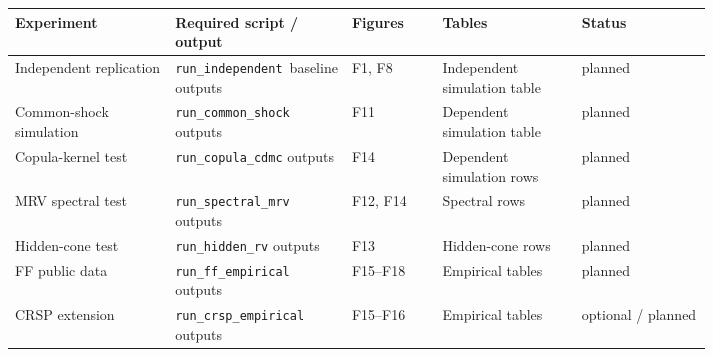 \begingroup
\small
\renewcommand{\arraystretch}{1.15}
\begin{tabularx}{\linewidth}{>{\raggedright\arraybackslash}p{0.23\linewidth}>{\raggedright\arraybackslash}p{0.25\linewidth}>{\raggedright\arraybackslash}p{0.13\linewidth}>{\raggedright\arraybackslash}p{0.20\linewidth}>{\raggedright\arraybackslash}X}
\toprule
Experiment & Required script / output & Figures & Tables & Status \\
\midrule
Independent replication & \texttt{run\_independent}\ baseline outputs & F1, F8 & Independent simulation table & planned \\
Common-shock simulation & \texttt{run\_common\_shock} outputs & F11 & Dependent simulation table & planned \\
Copula-kernel test & \texttt{run\_copula\_cdmc} outputs & F14 & Dependent simulation rows & planned \\
MRV spectral test & \texttt{run\_spectral\_mrv} outputs & F12, F14 & Spectral rows & planned \\
Hidden-cone test & \texttt{run\_hidden\_rv} outputs & F13 & Hidden-cone rows & planned \\
FF public data & \texttt{run\_ff\_empirical} outputs & F15--F18 & Empirical tables & planned \\
CRSP extension & \texttt{run\_crsp\_empirical} outputs & F15--F16 & Empirical tables & optional / planned \\
\bottomrule
\end{tabularx}
\endgroup
